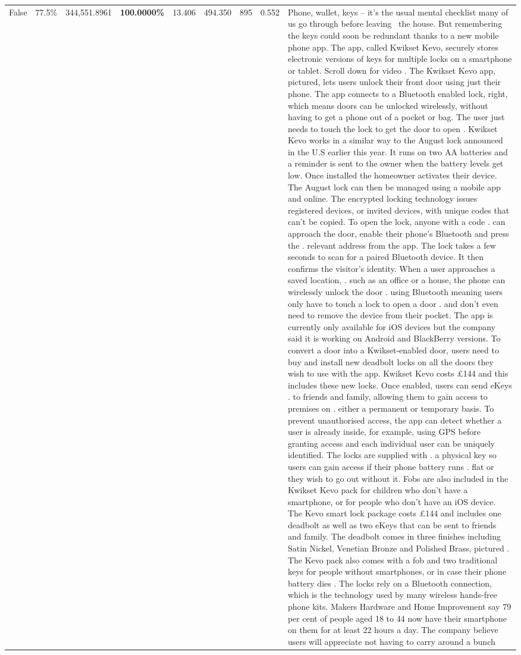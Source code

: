 \begin{table}[H]
\begin{tabular}{lllrlllll}
False & 77.5\% & 344,551.8961 & \bfseries \color{red} 100.0000\% & 13.406 & 494.350 & 895 & 0.552 & Phone, wallet, keys – it’s the usual mental checklist many of us go through before leaving  the house. But remembering the keys could soon be redundant thanks to a new mobile phone app. The app, called Kwikset Kevo, securely stores electronic versions of keys for multiple locks on a smartphone or tablet. Scroll down for video . The Kwikset Kevo app, pictured, lets users unlock their front door using just their phone. The app connects to a Bluetooth enabled lock, right, which means doors can be unlocked wirelessly, without having to get a phone out of a pocket or bag. The user just needs to touch the lock to get the door to open . Kwikset Kevo works in a similar way to the August lock announced in the U.S earlier this year. It runs on two AA batteries and a reminder is sent to the owner when the battery levels get low. Once installed the homeowner activates their device. The August lock can then be managed using a mobile app and online. The encrypted locking technology issues registered devices, or invited devices, with unique codes that can't be copied. To open the lock, anyone with a code . can approach the door, enable their phone's Bluetooth and press the . relevant address from the app. The lock takes a few seconds to scan for a paired Bluetooth device. It then confirms the visitor's identity. When a user approaches a saved location, . such as an office or a house, the phone can wirelessly unlock the door . using Bluetooth meaning users only have to touch a lock to open a door . and don't even need to remove the device from their pocket. The app is currently only available for iOS devices but the company said it is working on Android and BlackBerry versions. To convert a door into a Kwikset-enabled door, users need to buy and install new deadbolt locks on all the doors they wish to use with the app. Kwikset Kevo costs £144 and this includes these new locks. Once enabled, users can send eKeys . to friends and family, allowing them to gain access to premises on . either a permanent or temporary basis. To prevent unauthorised access, the app can detect whether a user is already inside, for example, using GPS before granting access and each individual user can be uniquely identified. The locks are supplied with . a physical key so users can gain access if their phone battery runs . flat or they wish to go out without it. Fobs are also included in the Kwikset Kevo pack for children who don't have a smartphone, or for people who don't have an iOS device. The Kevo smart lock package costs £144 and includes one deadbolt as well as two eKeys that can be sent to friends and family. The deadbolt comes in three finishes including Satin Nickel, Venetian Bronze and Polished Brass, pictured . The Kevo pack also comes with a fob and two traditional keys for people without smartphones, or in case their phone battery dies . The locks rely on a Bluetooth connection, which is the technology used by many wireless hands-free phone kits. Makers Hardware and Home Improvement say 79 per cent of people aged 18 to 44 now have their smartphone on them for at least 22 hours a day. The company believe users will appreciate not having to carry around a bunch 
\end{tabular}
\end{table}
